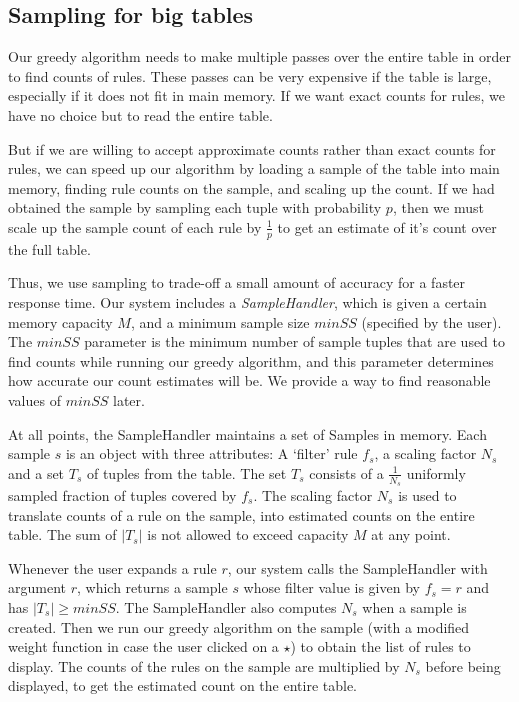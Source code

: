 \documentclass{sig-alternate}
\newcounter{prob}
\begin{document}
\subsection{Sampling for big tables}
Our greedy algorithm needs to make multiple passes over the entire table in order to find counts of rules. These passes can be very expensive if the table is large, especially if it does not fit in main memory. If we want exact counts for rules, we have no choice but to read the entire table. 

But if we are willing to accept approximate counts rather than exact counts for rules, we can speed up our algorithm by loading a sample of the table into main memory, finding rule counts on the sample, and scaling up the count. If we had obtained the sample by sampling each tuple with probability $p$, then we must scale up the sample count of each rule by $\frac{1}{p}$ to get an estimate of it's count over the full table.

Thus, we use sampling to trade-off a small amount of accuracy for a faster response time. Our system includes a {\em SampleHandler}, which is given a certain memory capacity $M$, and a minimum sample size $minSS$ (specified by the user).
The $minSS$ parameter is the minimum number of sample tuples that are used to find counts while running our greedy algorithm, and this parameter determines how accurate our count estimates will be. We provide a way to find reasonable values of $minSS$ later.

At all points, the SampleHandler maintains a set of Samples in memory. Each sample $s$ is an object with three attributes: A `filter' rule $f_s$, a scaling factor $N_s$ and a set $T_s$ of tuples from the table. The set $T_s$ consists of a $\frac{1}{N_s}$ uniformly sampled fraction of tuples covered by $f_s$. The scaling factor $N_s$ is used to translate counts of a rule on the sample, into estimated counts on the entire table. The sum of $|T_s|$ is not allowed to exceed capacity $M$ at any point. 

Whenever the user expands a rule $r$, our system calls the SampleHandler with argument $r$, which returns a sample $s$ whose filter value is given by $f_s = r$ and has $|T_s| \geq minSS$. The SampleHandler also computes $N_s$ when a sample is created. Then we run our greedy algorithm on the sample (with a modified weight function in case the user clicked on a $\star$) to obtain the list of rules to display. The counts of the rules on the sample are multiplied by $N_s$ before being displayed, to get the estimated count on the entire table. 
\end{document}
